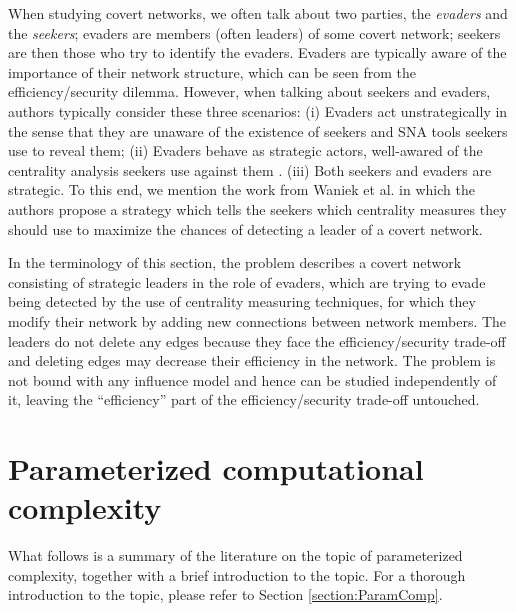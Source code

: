 When studying covert networks, we often talk about two parties, the \emph{evaders} and the \emph{seekers};
evaders are members (often leaders) of some covert network;
seekers are then those who try to identify the evaders.
Evaders are typically aware of the importance of their network structure, which can be seen from
the efficiency/security dilemma.
However, when talking about seekers and evaders, authors typically consider these three scenarios:
(i) Evaders act unstrategically in the sense that they are unaware of
the existence of seekers and SNA tools seekers use to reveal them;
(ii) Evaders behave as strategic actors, well-awared of the centrality analysis
seekers use against them \cite{Waniek2017,Dey2019,Waniek2016,Dey2020}.
(iii) Both seekers and evaders are strategic.
To this end, we mention the work from Waniek et al. \cite{Waniek2021} in which the authors propose a strategy
which tells the seekers which centrality measures they should use
to maximize the chances of detecting a leader of a covert network.

In the terminology of this section, the \HL problem describes a covert network consisting of strategic leaders
in the role of evaders, which are trying to evade being detected by the use of centrality measuring techniques,
for which they modify their network by adding new connections between network members.
The leaders do not delete any edges because they face the efficiency/security trade-off and
deleting edges may decrease their efficiency in the network.
The problem is not bound with any influence model and hence can be studied independently of it,
leaving the ``efficiency'' part of the efficiency/security trade-off untouched.


\section{Parameterized computational complexity}\label{section:litRev:ParamCompl}

What follows is a summary of the literature on the topic of parameterized complexity,
together with a brief introduction to the topic.
For a thorough introduction to the topic, please refer to Section \ref{section:ParamComp}.

